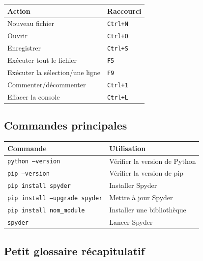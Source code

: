 \documentclass[12pt,a4paper]{article}
\begin{document}
	\begin{center}
		\begin{tabular}{|l|l|}
			\hline
			\textbf{Action} & \textbf{Raccourci} \\
			\hline
			Nouveau fichier & \texttt{Ctrl+N} \\
			Ouvrir & \texttt{Ctrl+O} \\
			Enregistrer & \texttt{Ctrl+S} \\
			Exécuter tout le fichier & \texttt{F5} \\
			Exécuter la sélection/une ligne & \texttt{F9} \\
			Commenter/décommenter & \texttt{Ctrl+1} \\
			Effacer la console & \texttt{Ctrl+L} \\
			\hline
		\end{tabular}
	\end{center}
	
	\subsection*{Commandes principales}
	
	\begin{center}
		\begin{tabular}{|l|l|}
			\hline
			\textbf{Commande} & \textbf{Utilisation} \\
			\hline
			\texttt{python --version} & Vérifier la version de Python \\
			\texttt{pip --version} & Vérifier la version de pip \\
			\texttt{pip install spyder} & Installer Spyder \\
			\texttt{pip install --upgrade spyder} & Mettre à jour Spyder \\
			\texttt{pip install nom\_module} & Installer une bibliothèque \\
			\texttt{spyder} & Lancer Spyder \\
			\hline
		\end{tabular}
	\end{center}
	
	\subsection*{Petit glossaire récapitulatif}
	
\end{document}
